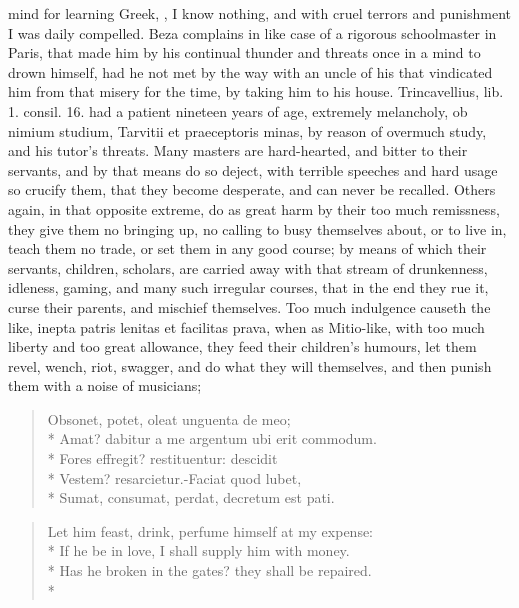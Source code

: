 {mind for learning Greek, , I know nothing, and with
cruel terrors and punishment I was daily compelled. Beza
complains in like case of a rigorous schoolmaster in Paris, that made
him by his continual thunder and threats once in a mind to drown
himself, had he not met by the way with an uncle of his that vindicated
him from that misery for the time, by taking him to his house.
Trincavellius, lib. 1. consil. 16. had a patient nineteen years of age,
extremely melancholy, ob nimium studium, Tarvitii et praeceptoris
minas, by reason of overmuch study, and his tutor's threats. Many
masters are hard-hearted, and bitter to their servants, and by that
means do so deject, with terrible speeches and hard usage so crucify
them, that they become desperate, and can never be recalled.
Others again, in that opposite extreme, do as great harm by their too
much remissness, they give them no bringing up, no calling to busy
themselves about, or to live in, teach them no trade, or set them in
any good course; by means of which their servants, children, scholars,
are carried away with that stream of drunkenness, idleness, gaming, and
many such irregular courses, that in the end they rue it, curse their
parents, and mischief themselves. Too much indulgence causeth the like,
inepta patris lenitas et facilitas prava, when as Mitio-like,
with too much liberty and too great allowance, they feed their
children's humours, let them revel, wench, riot, swagger, and do what
they will themselves, and then punish them with a noise of musicians;
%
\begin{latin}
\begin{verse}
Obsonet, potet, oleat unguenta de meo;\\*
Amat? dabitur a me argentum ubi erit commodum.\\*
Fores effregit? restituentur: descidit\\*
Vestem? resarcietur.-Faciat quod lubet,\\*
Sumat, consumat, perdat, decretum est pati.
\end{verse}
\end{latin}
\translationrule
\begin{verse}
Let him feast, drink, perfume himself at my expense:\\*
If he be in love, I shall supply him with money.\\*
Has he broken in the gates? they shall be repaired.\\*

\end{verse}}
